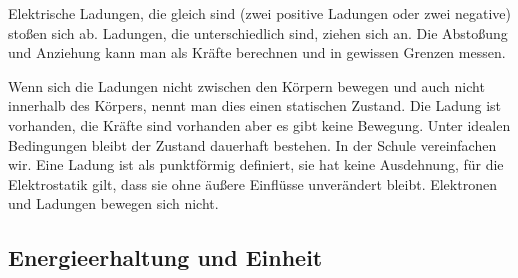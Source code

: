 
Elektrische Ladungen, die gleich sind (zwei positive Ladungen oder zwei negative) stoßen sich ab. Ladungen, die unterschiedlich sind, ziehen sich an. Die Abstoßung und Anziehung kann man als Kräfte berechnen und in gewissen Grenzen messen.

Wenn sich die Ladungen nicht zwischen den Körpern bewegen und auch nicht innerhalb des Körpers, nennt man dies einen statischen Zustand. Die Ladung ist vorhanden, die Kräfte sind vorhanden aber es gibt keine Bewegung. Unter idealen Bedingungen bleibt der Zustand dauerhaft bestehen. In der Schule vereinfachen wir. Eine Ladung ist als punktförmig definiert, sie hat keine Ausdehnung, für die Elektrostatik gilt, dass sie ohne äußere Einflüsse unverändert bleibt. Elektronen und Ladungen bewegen sich nicht.

\subsection[Energieerhaltung]{Energieerhaltung und Einheit}
%

